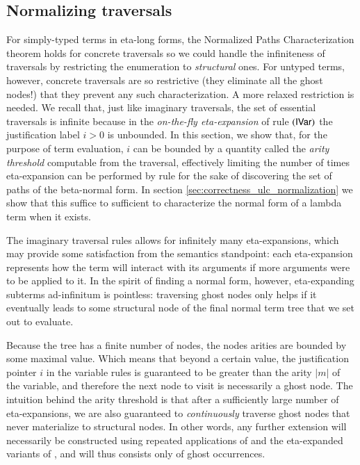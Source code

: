 \documentclass{elsarticle}
\theoremstyle{plain}
\theoremstyle{definition}
\theoremstyle{remark}
\newcommand{\ghostvar}{\theta}
\begin{document}
\subsection{Normalizing traversals}

For simply-typed terms in eta-long forms, the
Normalized Paths Characterization theorem holds for concrete traversals so we could  handle the infiniteness of traversals by restricting the enumeration to \emph{structural} ones. For untyped terms, however, concrete traversals
are so restrictive (they eliminate all the ghost nodes!) that they prevent any such characterization.
A more relaxed restriction is needed.
We recall that, just like imaginary traversals, the set of essential traversals is infinite because in the \emph{on-the-fly eta-expansion} of rule $\mathbf{({\sf IVar})}$ the justification label $i>0$ is unbounded. In this section, we show that,
for the purpose of term evaluation, $i$ can be bounded by a quantity called the \emph{arity threshold} computable from the traversal,
effectively limiting the number of times eta-expansion can be performed by rule  for the sake of discovering the set of paths of the beta-normal form. In section \ref{sec:correctness_ulc_normalization} we show that this suffice to  sufficient to characterize the normal form of a lambda term when it exists.

The imaginary traversal rules allows for infinitely many eta-expansions, which may provide some satisfaction from the semantics standpoint: each eta-expansion represents how the term will interact with its arguments if more arguments were to be applied to it. In the spirit of finding a normal form, however, eta-expanding subterms ad-infinitum is pointless: traversing ghost nodes only helps if it eventually leads to some structural node of the final normal term tree that we set out to evaluate.

Because the tree has a finite number of nodes, the nodes arities are bounded by some maximal value. Which means that beyond a certain value, the
justification pointer $i$ in the variable rules  is guaranteed to be greater than the arity $|m|$ of the variable, and therefore the next node to visit is necessarily a ghost node. The intuition behind the arity threshold is that after a sufficiently large number of eta-expansions, we are also guaranteed to \emph{continuously} traverse ghost nodes that never materialize to structural nodes. In other words, any further extension will necessarily be constructed using repeated applications of \rulenamet{Lam^\ghostvar} and the eta-expanded variants of , and will thus consists only of ghost occurrences.
\end{document}
